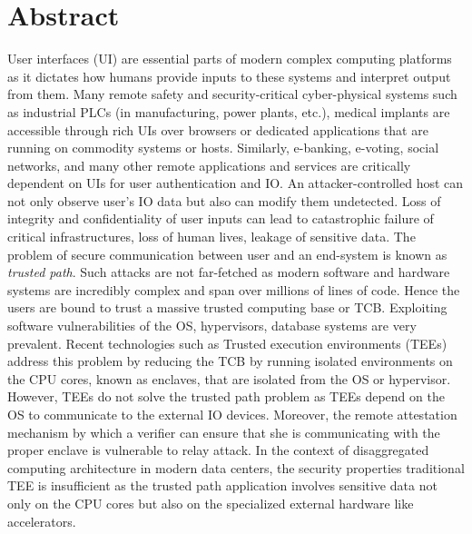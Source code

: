 \begingroup
\let\clearpage\relax
\let\cleardoublepage\relax
\let\cleardoublepage\relax

\chapter*{Abstract}

User interfaces (UI) are essential parts of modern complex computing platforms as it dictates how humans provide inputs to these systems and interpret output from them. Many remote safety and security-critical cyber-physical systems such as industrial PLCs (in manufacturing, power plants, etc.), medical implants are accessible through rich UIs over browsers or dedicated applications that are running on commodity systems or hosts. Similarly, e-banking, e-voting, social networks, and many other remote applications and services are critically dependent on UIs for user authentication and IO. An attacker-controlled host can not only observe user's IO data but also can modify them undetected. Loss of integrity and confidentiality of user inputs can lead to catastrophic failure of critical infrastructures, loss of human lives, leakage of sensitive data. The problem of secure communication between user and an end-system is known as \emph{trusted path}. Such attacks are not far-fetched as modern software and hardware systems are incredibly complex and span over millions of lines of code. Hence the users are bound to trust a massive trusted computing base or TCB. Exploiting software vulnerabilities of the OS, hypervisors, database systems are very prevalent. Recent technologies such as Trusted execution environments (TEEs) address this problem by reducing the TCB by running isolated environments on the CPU cores, known as enclaves, that are isolated from the OS or hypervisor. However, TEEs do not solve the trusted path problem as TEEs depend on the OS to communicate to the external IO devices. Moreover, the remote attestation mechanism by which a verifier can ensure that she is communicating with the proper enclave is vulnerable to relay attack. In the context of disaggregated computing architecture in modern data centers, the security properties traditional TEE is insufficient as the trusted path application involves sensitive data not only on the CPU cores but also on the specialized external hardware like accelerators.


